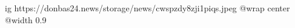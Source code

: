  
 
 
 
 

\ifcmt
  ig https://donbas24.news/storage/news/cwspzdy8zji1piqs.jpeg
  @wrap center
  @width 0.9
\fi
